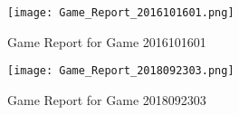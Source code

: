 \documentclass [a4paper,12pt] {article}
\begin{document}
    \begin{figure}
        \texttt{[image: Game\_Report\_2016101601.png]}
        \caption{Game Report for Game 2016101601}
        \label{fig:game2016101601}
    \end{figure} 

    \begin{figure}
        \texttt{[image: Game\_Report\_2018092303.png]}
        \caption{Game Report for Game 2018092303}
        \label{fig:game2018092303}
    \end{figure} 
\end{document}

